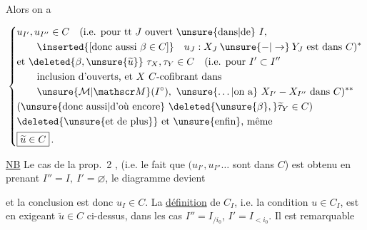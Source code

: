 Alors on a 

\[
\left\{\begin{aligned}
 &u_{I'},u_{I''}\in C\quad (\text{i.e. pour tt }J\text{ ouvert \unsure{dans|de} }I,\!\\
 &\qquad \inserted{[\text{donc aussi }\beta\in C]}\quad u_J:X_J\mathbin{\unsure{-|\to}}Y_J\text{ est dans }C)^{*}\\
 &\text{et }\deleted{\beta,\unsure{\widetilde u}}\ \tau_X,\tau_Y\in C\quad(\text{i.e. pour }I'\subset I''\\
 &\qquad\text{inclusion d’ouverts, et }X\ C\text{-cofibrant dans}\\
 &\qquad\unsure{\mathcal M|\mathscr M}(I^\circ),\ \unsure{\ldots|\text{on a}}\ X_{I'}\mathbin{-}X_{I''}\text{ dans }C)^{**}\\
 &(\text{\unsure{donc aussi|d’où encore} }\deleted{\unsure{\beta},}\widetilde\tau_Y\in C)\\
 &\deleted{\text{\unsure{et de plus}}}\ \text{et \unsure{enfin}, même}\\
 &\boxed{\widetilde u\in C}\,.
\end{aligned}\right.
\]



 \uline{NB} Le cas de la prop.~2  , (i.e.  le fait que  $(u_{I'},u_{I''}\ldots$ sont dans $C$) est obtenu en prenant $I''=I,\ I'=\varnothing$, le diagramme devient


et la conclusion est donc $u_I\in C$. \inserted{$^{*}$} La \uline{définition} de $C_I$, i.e. la condition $u\in C_I$, est  en exigeant $\widetilde u\in C$  ci-dessus, dans les cas $I''=I_{/i_0}$, $I'=I_{<i_0}$. Il est remarquable

